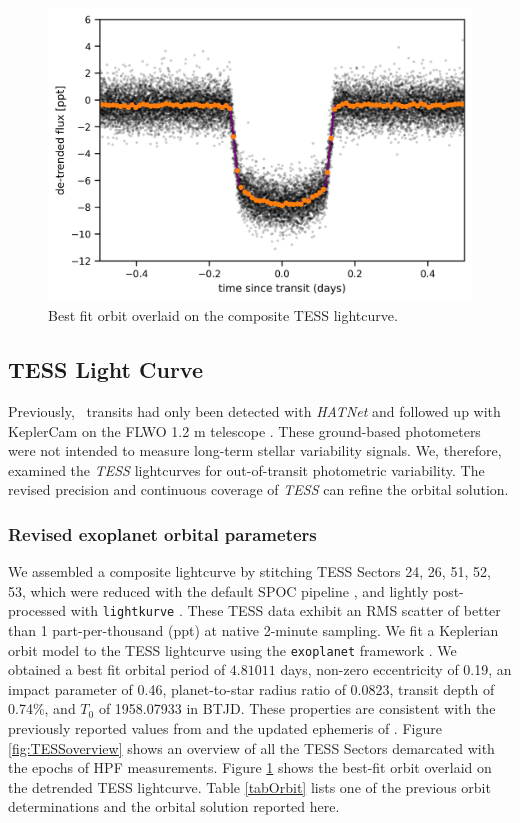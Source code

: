\documentclass[twocolumn]{aastex631}
\newcommand{\hatpb}{\object{HAT-P-67 b}}
\begin{document}
\begin{figure}
    \includegraphics[width=\linewidth]{figures/best_fit_orbit.png}
    \caption{Best fit orbit overlaid on the composite TESS lightcurve.}
    \label{fig:transit}
\end{figure}

\subsection{TESS Light Curve}
Previously, \hatpb~transits had only been detected with \emph{HATNet} \citep{2004PASP..116..266B} and followed up with KeplerCam on the FLWO 1.2 m telescope \citep{2017AJ....153..211Z}. These ground-based photometers were not intended to measure long-term stellar variability signals.  We, therefore, examined the \emph{TESS} lightcurves for out-of-transit photometric variability.  The revised precision and continuous coverage of \emph{TESS} can refine the orbital solution.

\subsubsection{Revised exoplanet orbital parameters}
We assembled a composite lightcurve by stitching TESS Sectors 24, 26, 51, 52, 53, which were reduced with the default SPOC pipeline \citep{2020RNAAS...4..201C}, and lightly post-processed with \texttt{lightkurve} \citep{geert_barentsen_2019_2565212}.  These TESS data exhibit an RMS scatter of better than 1 part-per-thousand (ppt) at native 2-minute sampling.  We fit a Keplerian orbit model to the TESS lightcurve using the \texttt{exoplanet} framework \citep{exoplanet:joss}.  We obtained a best fit orbital period of $4.81011$ days, non-zero eccentricity of 0.19, an impact parameter of 0.46, planet-to-star radius ratio of 0.0823, transit depth of 0.74\%, and $T_0$ of 1958.07933 in BTJD.  These properties are consistent with the previously reported values from \citet{2017AJ....153..211Z} and the updated ephemeris of \citet{2022ApJS..259...62I}.  Figure \ref{fig:TESSoverview} shows an overview of all the TESS Sectors demarcated with the epochs of HPF measurements.  Figure \ref{fig:transit} shows the best-fit orbit overlaid on the detrended TESS lightcurve.  Table \ref{tabOrbit} lists one of the previous orbit determinations and the orbital solution reported here.
\end{document}
